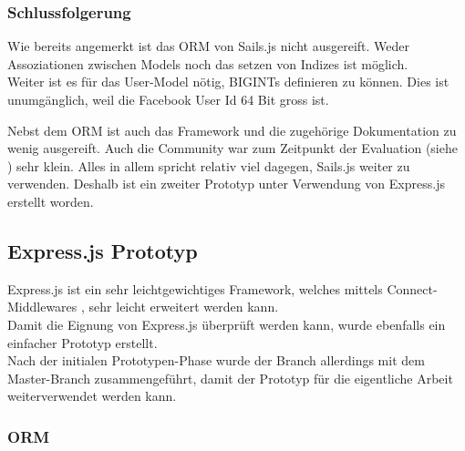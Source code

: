 \subsubsection*{Schlussfolgerung}

Wie bereits angemerkt ist das ORM von Sails.js nicht ausgereift. Weder Assoziationen zwischen Models \cite{SailsjsModelAssociations} noch das setzen von Indizes ist möglich.\\
Weiter ist es für das User-Model nötig, BIGINTs definieren zu können. Dies ist unumgänglich, weil die Facebook User Id 64 Bit gross ist.

Nebst dem ORM ist auch das Framework und die zugehörige Dokumentation zu wenig ausgereift. Auch die Community war zum Zeitpunkt der Evaluation (siehe ) sehr klein.
Alles in allem spricht relativ viel dagegen, Sails.js weiter zu verwenden. Deshalb ist ein zweiter Prototyp unter Verwendung von Express.js erstellt worden.

\subsection*{Express.js Prototyp}

Express.js \cite{Expressjs} ist ein sehr leichtgewichtiges Framework, welches mittels Connect-Middlewares \cite{connect}, sehr leicht erweitert werden kann.\\[1mm]
Damit die Eignung von Express.js überprüft werden kann, wurde ebenfalls ein einfacher Prototyp \cite{ExpressjsPrototyp} erstellt.\\
Nach der initialen Prototypen-Phase wurde der Branch allerdings mit dem Master-Branch zusammengeführt, damit der Prototyp für die eigentliche Arbeit weiterverwendet werden kann.

\subsubsection*{\gls{ORM}}
